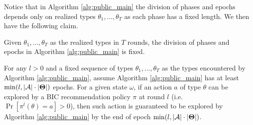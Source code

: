 Notice that in Algorithm \ref{alg:public_main} the division of phases and epochs depends only on realized types $\theta_1,...,\theta_T$ as each phase has a fixed length. We then have the following claim.
\begin{claim}
Given $\theta_1,...,\theta_T$ as the realized types in $T$ rounds, the division of phases and epochs in Algorithm \ref{alg:public_main} is fixed.
\end{claim}

\begin{lemma}
\label{lem:exp_public}
For any $l>0$ and a fixed sequence of types $\theta_1,...,\theta_T$ as the types encountered by Algorithm \ref{alg:public_main}, assume Algorithm \ref{alg:public_main} has at least $\min(l, |\mathcal{A}|\cdot |\bold{\Theta}|)$ epochs.
For a given state $\omega$, if an action $a$ of type $\theta$ can be explored by a BIC recommendation policy $\pi$ at round $l$ (i.e. $ \Pr[\pi^l(\theta)= a]> 0$), then such action is guaranteed to be explored by Algorithm \ref{alg:public_main} by the end of epoch $\min(l, |\mathcal{A}|\cdot |\bold{\Theta}|)$.
\end{lemma}

